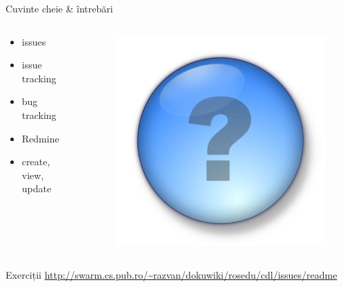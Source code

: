 \documentclass{beamer}
\begin{document}
\begin{frame}{Cuvinte cheie \& întrebări}
  \begin{columns}
    \begin{column}[l]{0.5\textwidth}
      \begin{itemize}
        \item issues
        \item issue tracking
        \item bug tracking
        \item Redmine
        \item create, view, update
      \end{itemize}
    \end{column}
    \begin{column}[c]{0.5\textwidth}
      \begin{figure}
        \pause \includegraphics[scale=0.4]{img/question-mark.jpg}
      \end{figure}
    \end{column}
  \end{columns}
\end{frame}

\begin{frame}{Exerciții}
  \footnotesize \url{http://swarm.cs.pub.ro/~razvan/dokuwiki/rosedu/cdl/issues/readme}
\end{frame}
\end{document}

